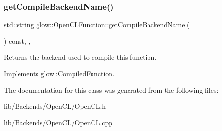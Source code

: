 \mbox{\label{classglow_1_1_open_c_l_function_ad676ba76a33a2e8802caa82052b569c9}} 
\subsubsection{\texorpdfstring{get\+Compile\+Backend\+Name()}{getCompileBackendName()}}
{\footnotesize\ttfamily std\+::string glow\+::\+Open\+C\+L\+Function\+::get\+Compile\+Backend\+Name (\begin{DoxyParamCaption}{ }\end{DoxyParamCaption}) const\hspace{0.3cm}{\ttfamily [inline]}, {\ttfamily [override]}, {\ttfamily [virtual]}}

\begin{DoxyReturn}{Returns}
the backend used to compile this function. 
\end{DoxyReturn}


Implements \hyperlink{classglow_1_1_compiled_function_a7b3f2b17986d14706a1d1091d3c4df27}{glow\+::\+Compiled\+Function}.



The documentation for this class was generated from the following files\+:\begin{DoxyCompactItemize}
\item 
lib/\+Backends/\+Open\+C\+L/Open\+C\+L.\+h\item 
lib/\+Backends/\+Open\+C\+L/Open\+C\+L.\+cpp\end{DoxyCompactItemize}
